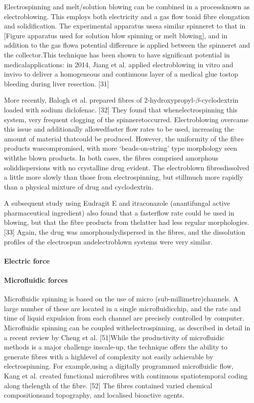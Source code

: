 \documentclass[5p,,preprint,12pt,twocolumn]{elsarticle}
\begin{document}
Electrospinning and melt/solution blowing can be combined in a processknown as electroblowing. This employs both electricity and a gas flow toaid fibre elongation and solidification. The experimental apparatus usesa similar spinneret to that in [Figure apparatus used for solution blow spinning or melt blowing], and in addition to the gas flowa potential difference is applied between the spinneret and the collector.This technique has been shown to have significant potential in medicalapplications: in 2014, Jiang et al. applied electroblowing in vitro and invivo to deliver a homogeneous and continuous layer of a medical glue tostop bleeding during liver resection. [31]

More recently, Balogh et al. prepared fibres of 2-hydroxypropyl-\ensuremath{\beta }-cyclodextrin loaded with sodium diclofenac. [32] They found that whenelectrospinning this system, very frequent clogging of the spinneretoccurred. Electroblowing overcame this issue and additionally allowedfaster flow rates to be used, increasing the amount of material thatcould be produced. However, the uniformity of the fibre products wascompromised, with more `beads-on-string' type morphology seen withthe blown products. In both cases, the fibres comprised amorphous soliddispersions with no crystalline drug evident. The electroblown fibresdissolved a little more slowly than those from electrospinning, but stillmuch more rapidly than a physical mixture of drug and cyclodextrin.

A subsequent study using Eudragit E and itraconazole (anantifungal active pharmaceutical ingredient) also found that a fasterflow rate could be used in blowing, but that the fibre products from thelatter had less regular morphologies. [33] Again, the drug was amorphouslydispersed in the fibres, and the dissolution profiles of the electrospun andelectroblown systems were very similar.



\paragraph{Electric force}



\paragraph{Microfluidic forces}Microfluidic spinning is based on the use of micro (sub-millimetre)channels. A large number of these are located in a single microfluidicchip, and the rate and time of liquid expulsion from each channel are precisely controlled by computer. Microfluidic spinning can be coupled withelectrospinning, as described in detail in a recent review by Cheng et al. [51]While the productivity of microfluidic methods is a major challenge inscale-up, the technique offers the ability to generate fibres with a highlevel of complexity not easily achievable by electrospinning. For example,using a digitally programmed microfluidic flow, Kang et al. created functional microfibres with continuous spatiotemporal coding along thelength of the fibre. [52] The fibres contained varied chemical compositionsand topography, and localised bioactive agents.
\end{document}

